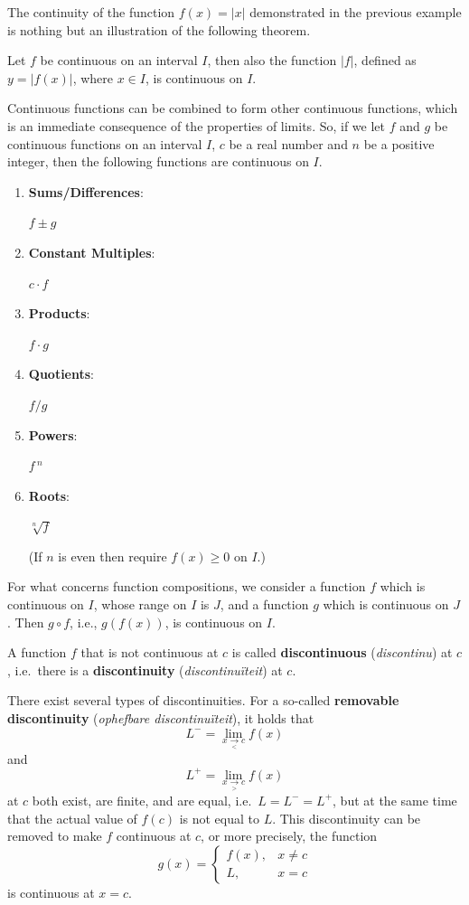 \ifcourse		
\ifanalysis

The continuity of the function $f(x)=|x|$ demonstrated in the previous example is nothing but an illustration of the following theorem.

\begin{theorem}
Let $f$ be continuous on an interval $I$, then also the function $|f|$, defined as $y= \left|f(x)\right|$, where $x \in I$, is continuous on $I$.
\end{theorem}

\fi
\fi
		
Continuous functions can be combined to form other continuous functions, which is an immediate consequence of the properties of limits. 
So, if we let $f$ and $g$ be continuous functions on an interval $I$,  $c$ be a real number and  $n$ be a positive integer, then the  following functions are continuous on $I$.
		\begin{enumerate}
		\item		\parbox{120pt}{\textbf{Sums/Differences}:}	$f\pm g$
		\item		\parbox{120pt}{\textbf{Constant Multiples}:}	$c\cdot f$
		\item		\parbox{120pt}{\textbf{Products}:}	$f\cdot g$
		\item		\parbox{120pt}{\textbf{Quotients}:}	$f/g$ 
		\item		\parbox{120pt}{\textbf{Powers}:}	$f\,^n$
		\item		\parbox{120pt}{\textbf{Roots}:}	$\sqrt[n]{f}$ \qquad \parbox[t]{200pt}{(If $n$ is even then require $f(x)\geq 0$ on $I$.)}%
		\end{enumerate}
For what concerns function compositions, we consider a function $f$ which is continuous on $I$,  whose range on $I$ is $J$, and a function $g$ which is continuous on $J$. Then $g\circ f$, i.e., $g(f(x))$, is continuous on $I$.


A function $f$ that is not continuous at $c$ is called \textbf{discontinuous} (\textit{discontinu}) at $c$, i.e.\ there is a \textbf{discontinuity} (\textit{discontinu\"iteit}) at $c$.  
 

\ifcourse
\ifanalysis

There exist several types of discontinuities.  For a so-called \textbf{removable discontinuity} (\textit{ophefbare discontinu\"iteit}), it holds that 
$$
L^{-}=\lim _{x\underset{<}{\rightarrow}c}f(x)
$$
and 
$$
 L^{+}=\lim _{x\underset{>}{\rightarrow}c}f(x) 
$$
at $c$ both exist, are finite, and are equal, i.e.\ $L = L^- = L^+$, but at the same time that the actual value of $f(c)$ is not equal to $L$. This discontinuity can be removed to make $f$ continuous at $c$, or more precisely, the function
$$
 g(x)=\begin{cases}f(x),&x\neq c\\L,&x=c\end{cases}
$$
is continuous at $x = c$. 

